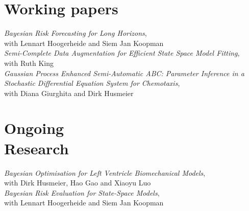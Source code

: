\documentclass[margin,line]{resume}
\begin{document}
\begin{resume}
\section{\mysidestyle Working papers}	
\textit{Bayesian Risk Forecasting for Long Horizons},\\
	with Lennart Hoogerheide and Siem Jan Koopman \vspace{1mm} \\ 
\textit{Semi-Complete Data Augmentation for Efficient State Space Model Fitting},\\ 
    with Ruth King \vspace{1mm} \\   
\textit{Gaussian Process Enhanced Semi-Automatic ABC: Parameter Inference in a Stochastic Differential Equation System for Chemotaxis},\\ 
    with Diana Giurghita and Dirk Husmeier  \\   

\vspace{-5mm}    		 	
\section{\mysidestyle Ongoing \\Research } 
   	\textit{Bayesian Optimisation for Left Ventricle Biomechanical Models},\\ 
    with Dirk Husmeier, Hao Gao and Xiaoyu Luo \vspace{1mm} \\   	
   	\textit{Bayesian Risk Evaluation for State-Space Models},\\ 
    with Lennart Hoogerheide and Siem Jan Koopman  \\  
      
\vspace{-5mm}



\end{resume}
\end{document}
